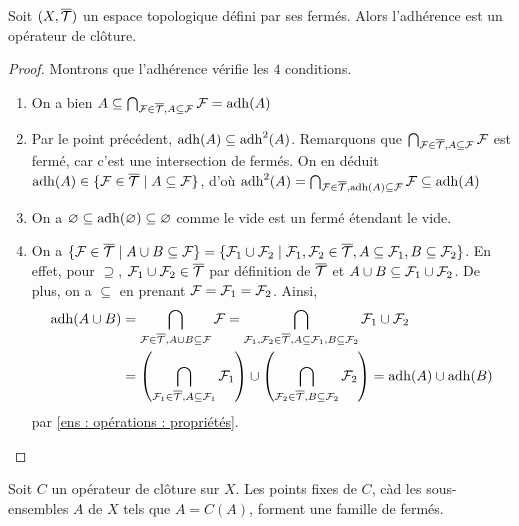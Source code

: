 \begin{proposition}
    Soit $(X,\overline{\mathcal{T}})$ un espace topologique défini par ses fermés. Alors l'adhérence est un opérateur de clôture.
\end{proposition}
\begin{proof} Montrons que l'adhérence vérifie les $4$ conditions.
   \begin{enumerate}
       \item On a bien $A\subseteq\bigcap_{\mathcal{F}\in\overline{\mathcal{T}}, A\subseteq\mathcal{F}}\mathcal{F} = \operatorname{adh}(A)$
       \item Par le point précédent, $\operatorname{adh}(A)\subseteq\operatorname{adh}^2(A)$. Remarquons que $\bigcap_{\mathcal{F}\in\overline{\mathcal{T}}, A\subseteq\mathcal{F}}\mathcal{F}$ est fermé, car c'est une intersection de fermés. On en déduit $\operatorname{adh}(A)\in\{\mathcal{F}\in\overline{\mathcal{T}}\mid A\subseteq\mathcal{F}\}$, d'où $\operatorname{adh}^2(A)=\bigcap_{\mathcal{F}\in\overline{\mathcal{T}}, \operatorname{adh}(A)\subseteq\mathcal{F}}\mathcal{F}\subseteq\operatorname{adh}(A)$
       \item On a $\varnothing\subseteq \operatorname{adh}(\varnothing)\subseteq\varnothing$ comme le vide est un fermé étendant le vide.
       \item On a $\{\mathcal{F}\in\overline{\mathcal{T}}\mid A\cup B\subseteq\mathcal{F}\} = \{\mathcal{F}_1\cup\mathcal{F}_2\mid \mathcal{F}_1,\mathcal{F}_2\in\overline{\mathcal{T}}, A\subseteq\mathcal{F}_1,B\subseteq\mathcal{F}_2\}$. En effet, pour $\supseteq$, $\mathcal{F}_1\cup\mathcal{F}_2\in\overline{\mathcal{T}}$ par définition de $\overline{\mathcal{T}}$ et $A\cup B\subseteq\mathcal{F}_1\cup\mathcal{F}_2$. De plus, on a $\subseteq$ en prenant $\mathcal{F} = \mathcal{F}_1 = \mathcal{F}_2$.
       Ainsi,
        \begin{align*}
           \operatorname{adh}(A\cup B) &= \bigcap_{\mathcal{F}\in\overline{\mathcal{T}}, A\cup B\subseteq\mathcal{F}}\mathcal{F} = \bigcap_{\mathcal{F}_1,\mathcal{F}_2\in\overline{\mathcal{T}}, A\subseteq\mathcal{F}_1, B\subseteq \mathcal{F}_2}\mathcal{F}_1\cup\mathcal{F}_2 \\
           &= \left(\bigcap_{\mathcal{F}_1\in\overline{\mathcal{T}}, A\subseteq\mathcal{F}_1}\mathcal{F}_1\right)\cup\left(\bigcap_{\mathcal{F}_2\in\overline{\mathcal{T}}, B\subseteq\mathcal{F}_2}\mathcal{F}_2\right) = \operatorname{adh}(A)\cup\operatorname{adh}(B)
        \end{align*} 
       par \ref{ens : opérations : propriétés}.
       \end{enumerate} 
\end{proof}
\begin{proposition}
    Soit $C$ un opérateur de clôture sur $X$. Les points fixes de $C$, càd les sous-ensembles $A$ de $X$ tels que $A = C(A)$, forment une famille de fermés.
\end{proposition}
